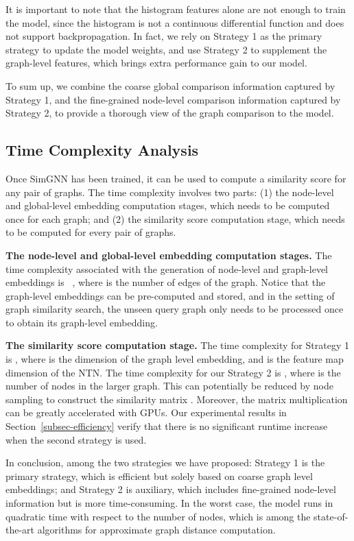 \documentclass[sigconf]{acmart}
\begin{document}
It is important to note that the histogram features alone are not enough to train the model, since the histogram is not a continuous differential function and does not support backpropagation. In fact, we rely on Strategy 1 as the primary strategy to update the model weights, and use Strategy 2 to supplement the graph-level features, which brings extra performance gain to our model. 

To sum up, we combine the coarse global comparison information captured by Strategy 1, and the fine-grained node-level comparison information captured by Strategy 2, to provide a thorough view of the graph comparison to the model.

\subsection{Time Complexity Analysis}
\label{subsec-time-comp-analysis}
Once SimGNN has been trained, it can be used to compute a similarity score for any pair of graphs. The time complexity involves two parts: (1) the node-level and global-level embedding computation stages, which needs to be computed once for each graph; and (2) the similarity score computation stage, which needs to be computed for every pair of graphs.

\noindent\textbf{The node-level and global-level embedding computation stages.} The time complexity associated with the generation of node-level and graph-level embeddings is ~\cite{kipf2016semi}, where  is the number of edges of the graph. Notice that the graph-level embeddings can be pre-computed and stored, and in the setting of graph similarity search, the unseen query graph only needs to be processed once to obtain its graph-level embedding. 

\noindent\textbf{The similarity score computation stage.}
The time complexity for Strategy 1 is ,  where  is the dimension of the graph level embedding, and  is the feature map dimension of the NTN. 
The time complexity for our Strategy 2 is , where  is the number of nodes in the larger graph. This can potentially be reduced by node sampling to construct the similarity matrix . Moreover, the matrix multiplication  can be greatly accelerated with GPUs. Our experimental results in Section~\ref{subsec-efficiency} verify that there is no significant runtime increase when the second strategy is used.

In conclusion, among the two strategies we have proposed: Strategy 1 is the primary strategy, which is efficient but solely based on coarse graph level embeddings; and Strategy 2 is auxiliary, which includes fine-grained node-level information but is more time-consuming. In the worst case, the model runs in quadratic time with respect to the number of nodes, which is among the state-of-the-art algorithms for approximate graph distance computation. 
\end{document}
